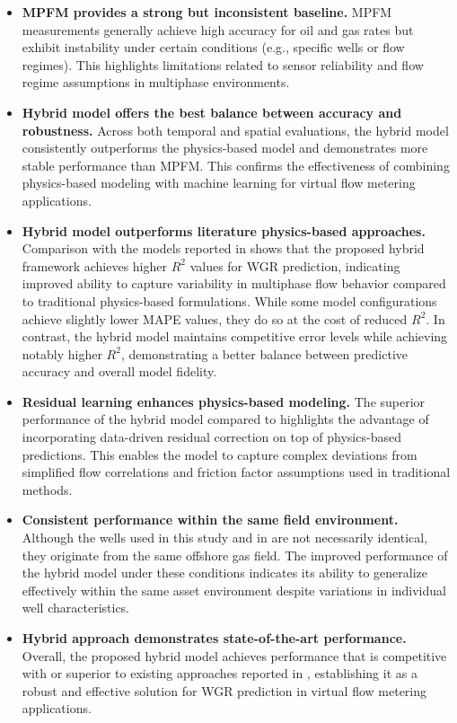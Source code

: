 \documentclass[12pt,APA]{uomthesis}
\begin{document}
\begin{itemize}
\item \textbf{MPFM provides a strong but inconsistent baseline.}  
MPFM measurements generally achieve high accuracy for oil and gas rates but exhibit instability under certain conditions (e.g., specific wells or flow regimes). This highlights limitations related to sensor reliability and flow regime assumptions in multiphase environments.

\item \textbf{Hybrid model offers the best balance between accuracy and robustness.}  
Across both temporal and spatial evaluations, the hybrid model consistently outperforms the physics-based model and demonstrates more stable performance than MPFM. This confirms the effectiveness of combining physics-based modeling with machine learning for virtual flow metering applications.

\item \textbf{Hybrid model outperforms literature physics-based approaches.}  
Comparison with the models reported in \citep{nemoto2023cloud} shows that the proposed hybrid framework achieves higher $R^2$ values for WGR prediction, indicating improved ability to capture variability in multiphase flow behavior compared to traditional physics-based formulations.
While some model configurations achieve slightly lower MAPE values, they do so at the cost of reduced $R^2$. In contrast, the hybrid model maintains competitive error levels while achieving notably higher $R^2$, demonstrating a better balance between predictive accuracy and overall model fidelity.

\item \textbf{Residual learning enhances physics-based modeling.}  
The superior performance of the hybrid model compared to \citep{nemoto2023cloud} highlights the advantage of incorporating data-driven residual correction on top of physics-based predictions. This enables the model to capture complex deviations from simplified flow correlations and friction factor assumptions used in traditional methods.

\item \textbf{Consistent performance within the same field environment.}  
Although the wells used in this study and in \citep{nemoto2023cloud} are not necessarily identical, they originate from the same offshore gas field. The improved performance of the hybrid model under these conditions indicates its ability to generalize effectively within the same asset environment despite variations in individual well characteristics.

\item \textbf{Hybrid approach demonstrates state-of-the-art performance.}  
Overall, the proposed hybrid model achieves performance that is competitive with or superior to existing approaches reported in \citep{nemoto2023cloud}, establishing it as a robust and effective solution for WGR prediction in virtual flow metering applications.

\end{itemize}
\end{document}
